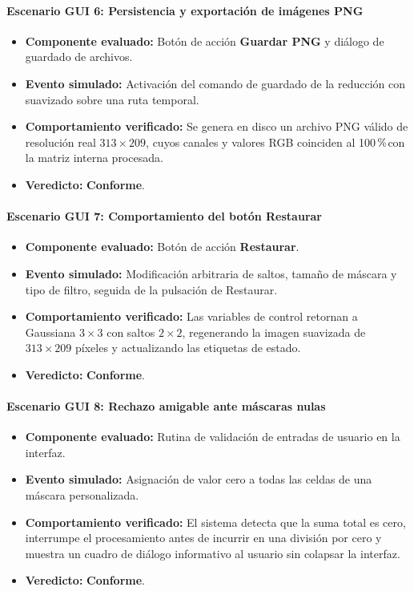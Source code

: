 \documentclass[11pt]{article}
\newcommand{\pct}{\ensuremath{\mathrm{\char37}}}
\newcommand{\pruebaok}{\textcolor{verdeExito}{\textbf{Conforme}}}
\begin{document}
\paragraph{Escenario GUI 6: Persistencia y exportación de imágenes PNG}
\begin{itemize}[itemsep=0.15em]
\item \textbf{Componente evaluado:} Botón de acción \textbf{Guardar PNG} y diálogo de guardado de archivos.
\item \textbf{Evento simulado:} Activación del comando de guardado de la reducción con suavizado sobre una ruta temporal.
\item \textbf{Comportamiento verificado:} Se genera en disco un archivo PNG válido de resolución real $313 \times 209$, cuyos canales y valores RGB coinciden al 100\,\pct con la matriz interna procesada.
\item \textbf{Veredicto:} \pruebaok.
\end{itemize}

\paragraph{Escenario GUI 7: Comportamiento del botón Restaurar}
\begin{itemize}[itemsep=0.15em]
\item \textbf{Componente evaluado:} Botón de acción \textbf{Restaurar}.
\item \textbf{Evento simulado:} Modificación arbitraria de saltos, tamaño de máscara y tipo de filtro, seguida de la pulsación de Restaurar.
\item \textbf{Comportamiento verificado:} Las variables de control retornan a Gaussiana $3\times3$ con saltos $2\times2$, regenerando la imagen suavizada de $313 \times 209$ píxeles y actualizando las etiquetas de estado.
\item \textbf{Veredicto:} \pruebaok.
\end{itemize}

\paragraph{Escenario GUI 8: Rechazo amigable ante máscaras nulas}
\begin{itemize}[itemsep=0.15em]
\item \textbf{Componente evaluado:} Rutina de validación de entradas de usuario en la interfaz.
\item \textbf{Evento simulado:} Asignación de valor cero a todas las celdas de una máscara personalizada.
\item \textbf{Comportamiento verificado:} El sistema detecta que la suma total es cero, interrumpe el procesamiento antes de incurrir en una división por cero y muestra un cuadro de diálogo informativo al usuario sin colapsar la interfaz.
\item \textbf{Veredicto:} \pruebaok.
\end{itemize}
\end{document}
